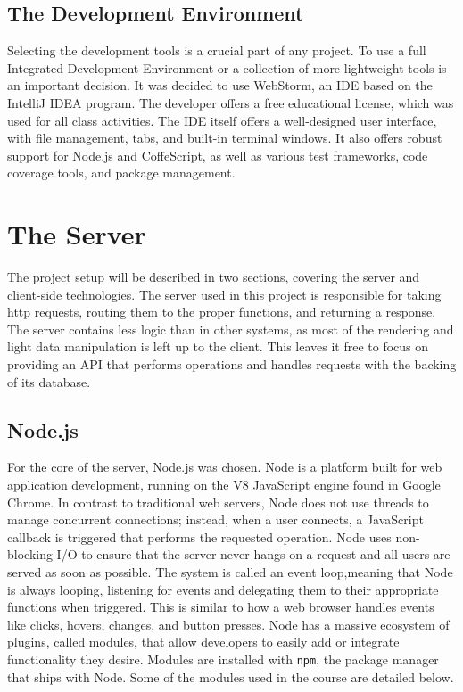 \documentclass[12pt]{article}
\newcommand{\code}[1]{{\texttt {#1}}}
\begin{document}
\subsection{The Development Environment}\label{sec:IDE}
Selecting the development tools is a crucial part of any project. To use a full Integrated Development Environment or a collection of more lightweight tools is an important decision. It was decided to use WebStorm, an IDE based on the IntelliJ IDEA program. The developer offers a free educational license, which was used for all class activities. The IDE itself offers a well-designed user interface, with file management, tabs, and built-in terminal windows. It also offers robust support for Node.js and CoffeScript, as well as various test frameworks, code coverage tools, and package management.

\section{The Server}\label{sec:server}
The project setup will be described in two sections, covering the server and client-side technologies. The server used in this project is responsible for taking http requests, routing them to the proper functions, and returning a response. The server contains less logic than in other systems, as most of the rendering and light data manipulation is left up to the client. This leaves it free to focus on providing an API that performs operations and handles requests with the backing of its database.

\subsection{Node.js}\label{sec:node}
For the core of the server, Node.js was chosen. Node is a platform built for web application development, running on the V8 JavaScript engine found in Google Chrome. In contrast to traditional web servers, Node does not use threads to manage concurrent connections; instead, when a user connects, a JavaScript callback is triggered that performs the requested operation. Node uses non-blocking I/O to ensure that the server never hangs on a request and all users are served as soon as possible. The system is called an event loop,meaning that Node is always looping, listening for events and delegating them to their appropriate functions when triggered. This is similar to how a web browser handles events like clicks, hovers, changes, and button presses. Node has a massive ecosystem of plugins, called modules, that allow developers to easily add or integrate functionality they desire. Modules are installed with \code{npm}, the package manager that ships with Node. Some of the modules used in the course are detailed below. 
\end{document}
